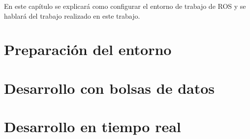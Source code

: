 
En este capítulo se explicará como configurar el entorno de trabajo de ROS y se hablará del trabajo realizado en este trabajo.


\section{Preparación del entorno}
\label{4:sec1}




\section{Desarrollo con bolsas de datos}
\label{4:sec2}




\section{Desarrollo en tiempo real}
\label{4:sec3}


